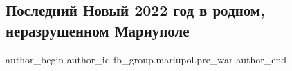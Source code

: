  
 
 
 
 

\subsection{Последний Новый 2022 год в родном, неразрушенном Мариуполе}
\label{sec:15_01_2023.fb.fb_group.mariupol.pre_war.1.poslednii_novii_2022}

\ifcmt
 author_begin
   author_id fb_group.mariupol.pre_war
 author_end
\fi
